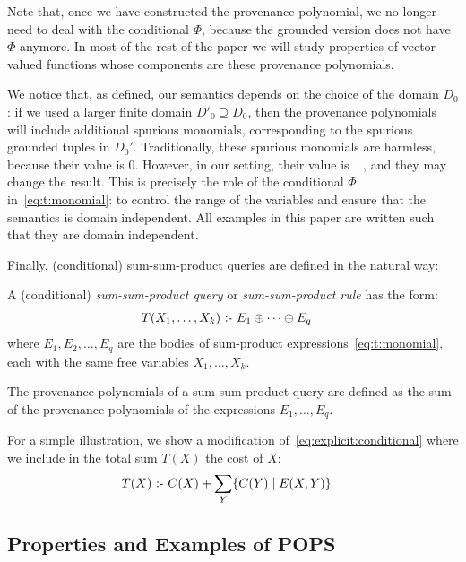 Note that, once we have constructed the provenance polynomial, we no longer need to deal with the
conditional $\Phi$, because the grounded version does not have $\Phi$ anymore.
In most of the rest of the paper we will study properties of vector-valued
functions whose components are these provenance polynomials.

We notice that, as defined, our semantics depends on the choice of the
domain $D_0$: if we used a larger finite domain $D'_0 \supseteq D_0$,
then the provenance polynomials will include additional spurious
monomials, corresponding to the spurious grounded tuples in $D_0'$.
Traditionally, these spurious monomials are harmless, because their
value is 0.  However, in our setting, their value is $\bot$, and they
may change the result.  This is precisely the role of the conditional
$\Phi$ in~\eqref{eq:t:monomial}: to control the range of the variables
and ensure that the semantics is domain independent.  All examples in
this paper are written such that they are domain independent.

Finally, (conditional) sum-sum-product queries are defined in the natural way:

\begin{defn} \label{def:sum:sum:product}
    A (conditional) {\em sum-sum-product query} or {\em sum-sum-product rule} has the
  form:
%
\begin{align}
  T(X_1, \ldots, X_k) &\text{ :- } E_1 \oplus \cdots \oplus E_q \label{eq:sum:sum:product}
  \end{align}
%
  where $E_1, E_2, \ldots, E_q$ are the bodies of sum-product
  expressions~\eqref{eq:t:monomial}, each with the same free variables
  $X_1, \ldots, X_k$.
\end{defn}

The provenance polynomials of a sum-sum-product query are defined as
the sum of the provenance polynomials of the expressions
$E_1, \ldots, E_q$.

For a simple illustration, we show a modification
of~\eqref{eq:explicit:conditional} where we include in the total sum
$T(X)$ the cost of $X$:
%
\begin{align*}
    T(X) \text{ :- } & C(X) + \sum_Y \{{C(Y)}\mid{E(X,Y)}\}
\end{align*}

\subsection{Properties and Examples of POPS}
\label{subsec:examples:pops}

